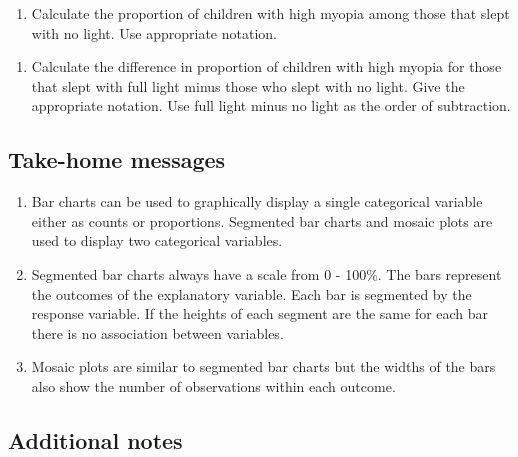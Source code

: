 \documentclass[
]{report}
\providecommand{\tightlist}{%
  \setlength{\itemsep}{0pt}\setlength{\parskip}{0pt}}
\begin{document}
\vspace{0.3in}

\begin{enumerate}
\def\labelenumi{\arabic{enumi}.}
\setcounter{enumi}{13}
\tightlist
\item
  Calculate the proportion of children with high myopia among those that slept with no light. Use appropriate notation.
\end{enumerate}

\vspace{0.3in}

\begin{enumerate}
\def\labelenumi{\arabic{enumi}.}
\setcounter{enumi}{14}
\tightlist
\item
  Calculate the difference in proportion of children with high myopia for those that slept with full light minus those who slept with no light. Give the appropriate notation. Use full light minus no light as the order of subtraction.
\end{enumerate}

\vspace{0.3in}

\hypertarget{take-home-messages-4}{%
\subsection{Take-home messages}\label{take-home-messages-4}}

\begin{enumerate}
\def\labelenumi{\arabic{enumi}.}
\item
  Bar charts can be used to graphically display a single categorical variable either as counts or proportions. Segmented bar charts and mosaic plots are used to display two categorical variables.
\item
  Segmented bar charts always have a scale from 0 - 100\%. The bars represent the outcomes of the explanatory variable. Each bar is segmented by the response variable. If the heights of each segment are the same for each bar there is no association between variables.
\item
  Mosaic plots are similar to segmented bar charts but the widths of the bars also show the number of observations within each outcome.
\end{enumerate}

\hypertarget{additional-notes-4}{%
\subsection{Additional notes}\label{additional-notes-4}}
\end{document}
